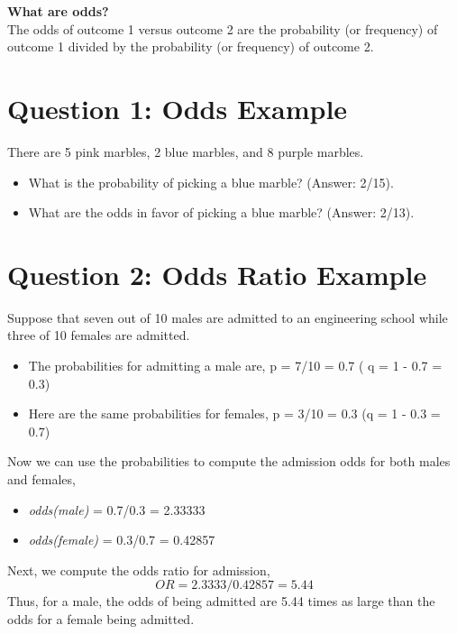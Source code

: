 \documentclass[a4paper,12pt]{article}
\begin{document}
\begin{framed}
\noindent \textbf{What are odds?}\\
The odds of outcome 1 versus outcome 2 are the probability (or frequency) of outcome 1 divided by the probability (or frequency) of outcome 2.
\end{framed}
	\section*{Question 1: Odds Example}
	There are 5 pink marbles, 2 blue marbles, and 8 purple marbles.
	
	\begin{itemize}
		\item What is the probability of picking a blue marble? (Answer: 2/15).
		\item What are the odds in favor of picking a blue marble? (Answer: 2/13).
	\end{itemize}

	\section*{Question 2: Odds Ratio Example}

Suppose that seven out of 10 males are admitted to an engineering school while three of 10 females are admitted. 

\begin{itemize}
	\item The probabilities for admitting a male are,
	p = 7/10 = 0.7      ( q = 1 - 0.7 = 0.3)
	\item Here are the same probabilities for females,
	p = 3/10 = 0.3       (q = 1 - 0.3 = 0.7)
\end{itemize}
Now we can use the probabilities to compute the admission odds for both males and females,
\begin{itemize}
	\item \textit{odds(male) }= 0.7/0.3 = 2.33333
	\item \textit{odds(female) }= 0.3/0.7 = 0.42857
\end{itemize}
Next, we compute the odds ratio for admission,
\[OR = 2.3333/0.42857 = 5.44\]
Thus, for a male, the odds of being admitted are 5.44 times as large than the odds for a female being admitted.
\end{document}
